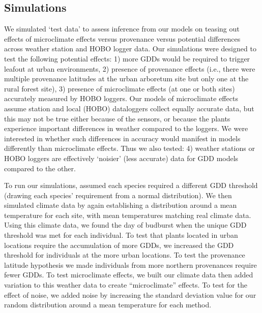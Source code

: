 \documentclass{article}\usepackage[]{graphicx}\usepackage[]{color}
\begin{document}
\subsection{Simulations}
We simulated `test data' \citep[sometimes referred to as `artificial data,' see][]{Hunter1992} to assess inference from our models on teasing out effects of microclimate effects versus provenance versus potential differences across weather station and HOBO logger data. Our simulations were designed to test the following potential effects: 1) more GDDs would be required to trigger leafout at urban environments, 2) presence of provenance effects (i.e., there were multiple provenance latitudes at the urban arboretum site but only one at the rural forest site), 3) presence of microclimate effects (at one or both sites) accurately measured by HOBO loggers. Our models of microclimate effects assume station and local (HOBO) dataloggers collect equally accurate data, but this may not be true either because of the sensors, or because the plants experience important differences in weather compared to the loggers. We were interested in whether such differences in accuracy would manifest in models differently than microclimate effects. Thus we also tested: 4) weather stations or HOBO loggers are effectively `noisier' (less accurate) data for GDD models compared to the other. 

To run our simulations, assumed each species required a different GDD threshold (drawing each species' requirement from a normal distribution). We then simulated climate data by again establishing a distribution around a mean temperature for each site, with mean temperatures matching real climate data. Using this climate data, we found the day of budburst when the unique GDD threshold was met for each individual. To test that plants located in urban locations require the accumulation of more GDDs, we increased the GDD threshold for individuals at the more urban locations. To test the provenance latitude hypothesis we made individuals from more northern provenances require fewer GDDs. To test microclimate effects, we built our climate data then added variation to this weather data to create ``microclimate'' effects.  To test for the effect of noise, we added noise by increasing the standard deviation value for our random distribution around a mean temperature for each method.
\end{document}
